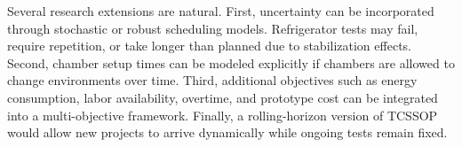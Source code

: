 \documentclass[11pt]{article}
\begin{document}
Several research extensions are natural. First, uncertainty can be incorporated through stochastic or robust scheduling models. Refrigerator tests may fail, require repetition, or take longer than planned due to stabilization effects. Second, chamber setup times can be modeled explicitly if chambers are allowed to change environments over time. Third, additional objectives such as energy consumption, labor availability, overtime, and prototype cost can be integrated into a multi-objective framework. Finally, a rolling-horizon version of TCSSOP would allow new projects to arrive dynamically while ongoing tests remain fixed.



\end{document}
